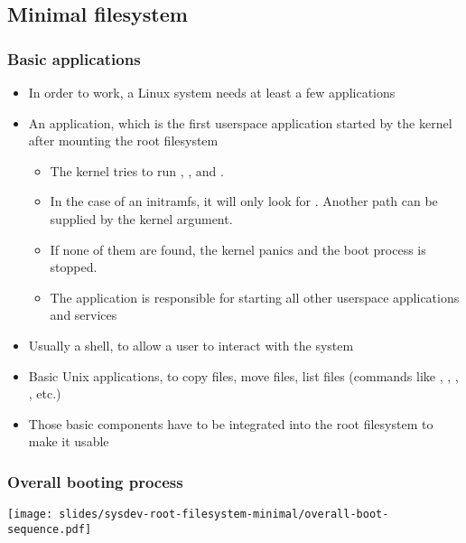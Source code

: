 \subsection{Minimal filesystem}
\begin{frame}
  \frametitle{Basic applications}
  \begin{itemize}
  \item In order to work, a Linux system needs at least a few
    applications
  \item An  application, which is the first userspace
    application started by the kernel after mounting the root
    filesystem
    \begin{itemize}
    \item The kernel tries to run , ,
       and .
    \item In the case of an initramfs, it will only look for
      . Another path can be supplied by the 
      kernel argument.
    \item If none of them are found, the kernel panics and the boot
      process is stopped.
    \item The  application is responsible for starting all other
      userspace applications and services
    \end{itemize}
  \item Usually a shell, to allow a user to interact with the system
  \item Basic Unix applications, to copy files, move files, list files
    (commands like , , , ,
    etc.)
  \item Those basic components have to be integrated into the root
    filesystem to make it usable
  \end{itemize}
\end{frame}

\begin{frame}
  \frametitle{Overall booting process}
  \begin{center}
    \texttt{[image: slides/sysdev-root-filesystem-minimal/overall-boot-sequence.pdf]}
  \end{center}
\end{frame}
